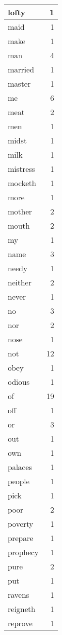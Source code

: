 \begin{center}
\begin{longtable}{l|r}
lofty & 1\\ \hline 
maid & 1\\ \hline 
make & 1\\ \hline 
man & 4\\ \hline 
married & 1\\ \hline 
master & 1\\ \hline 
me & 6\\ \hline 
meat & 2\\ \hline 
men & 1\\ \hline 
midst & 1\\ \hline 
milk & 1\\ \hline 
mistress & 1\\ \hline 
mocketh & 1\\ \hline 
more & 1\\ \hline 
mother & 2\\ \hline 
mouth & 2\\ \hline 
my & 1\\ \hline 
name & 3\\ \hline 
needy & 1\\ \hline 
neither & 2\\ \hline 
never & 1\\ \hline 
no & 3\\ \hline 
nor & 2\\ \hline 
nose & 1\\ \hline 
not & 12\\ \hline 
obey & 1\\ \hline 
odious & 1\\ \hline 
of & 19\\ \hline 
off & 1\\ \hline 
or & 3\\ \hline 
out & 1\\ \hline 
own & 1\\ \hline 
palaces & 1\\ \hline 
people & 1\\ \hline 
pick & 1\\ \hline 
poor & 2\\ \hline 
poverty & 1\\ \hline 
prepare & 1\\ \hline 
prophecy & 1\\ \hline 
pure & 2\\ \hline 
put & 1\\ \hline 
ravens & 1\\ \hline 
reigneth & 1\\ \hline 
reprove & 1\\ \hline 

\end{longtable}
\end{center}

